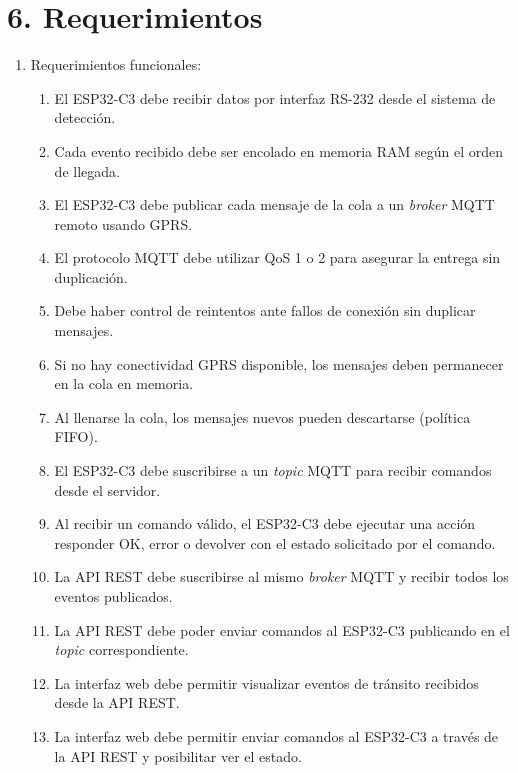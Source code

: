 \documentclass[
11pt, %
]{charter}
\begin{document}
\section{6. Requerimientos}
\label{sec:requerimientos}


\begin{enumerate}
	\item Requerimientos funcionales:
			\begin{enumerate}
			\item El ESP32-C3 debe recibir datos por interfaz RS-232 desde el sistema de detección.
			\item  Cada evento recibido debe ser encolado en memoria RAM según el orden de llegada.
			\item  El ESP32-C3 debe publicar cada mensaje de la cola a un \textit{broker} MQTT remoto usando GPRS.
			\item  El protocolo MQTT debe utilizar QoS 1 o 2 para asegurar la entrega sin duplicación.
			\item  Debe haber control de reintentos ante fallos de conexión sin duplicar mensajes.
			\item  Si no hay conectividad GPRS disponible, los mensajes deben permanecer en la cola en memoria.
			\item  Al llenarse la cola, los mensajes nuevos pueden descartarse (política FIFO).
			\item  El ESP32-C3 debe  suscribirse a un \textit{topic} MQTT para recibir comandos desde el servidor.
			\item  Al recibir un comando válido, el ESP32-C3 debe ejecutar una acción responder OK, error o   devolver con el estado solicitado por el comando.
			\item  La API REST debe suscribirse al mismo \textit{broker} MQTT y recibir todos los eventos publicados.
			\item  La API REST debe poder enviar comandos al ESP32-C3 publicando en el \textit{topic} correspondiente.
			\item  La interfaz web debe permitir visualizar eventos de tránsito recibidos desde la API REST.
			\item  La interfaz web debe permitir enviar comandos al ESP32-C3 a través de la API REST y posibilitar ver el estado.
		\end{enumerate}
		

\end{enumerate}
\end{document}
